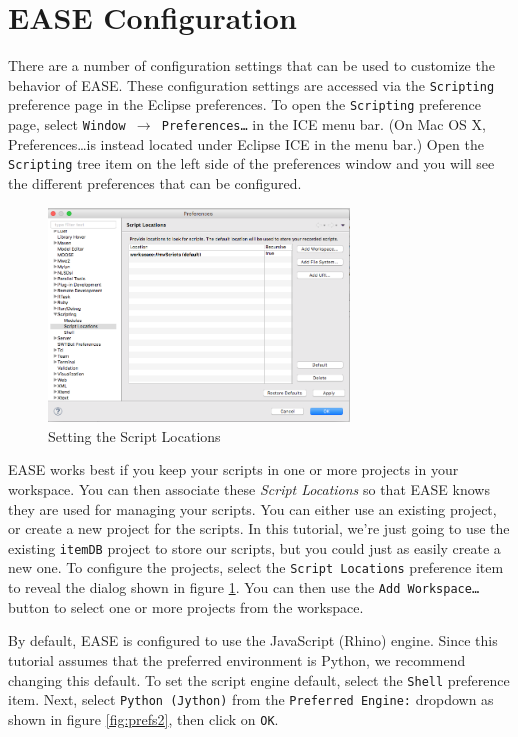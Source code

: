 \section{EASE Configuration}

There are a number of configuration settings that can be used to customize the
behavior of EASE. These configuration settings are accessed via the \texttt{Scripting}
preference page in the Eclipse preferences. To open the \texttt{Scripting}
preference page, select \texttt{Window $\rightarrow$ Preferences\ldots} in the
ICE menu bar. (On Mac OS X, Preferences\ldots is instead located under Eclipse
ICE in the menu bar.) Open the \texttt{Scripting} tree item on the left side of
the preferences window and you will see the different preferences that can be
configured.

\begin{figure}[!ht]
\centering
\includegraphics[width=8cm]{images/scripting-prefs1}
\caption{Setting the Script Locations}
\label{fig:prefs1}
\end{figure}

EASE works best if you keep your scripts in one or more projects in
your workspace. You can then associate these \emph{Script Locations} so
that EASE knows they are used for managing your scripts. You can either use an
existing project, or create a new project for the scripts. In this tutorial,
we're just going to use the existing \texttt{itemDB} project to store our scripts, but
you could just as easily create a new one. To configure the projects, select the
\texttt{Script Locations} preference item to reveal the dialog shown in figure
\ref{fig:prefs1}. You can then use the \texttt{Add Workspace\ldots} button to
select one or more projects from the workspace.

By default, EASE is configured to use the JavaScript (Rhino) engine.
Since this tutorial assumes that the preferred environment is Python, we recommend changing
this default. To set the script engine default, select the
\texttt{Shell} preference item. Next, select \texttt{Python (Jython)} from
the \texttt{Preferred Engine:} dropdown as shown in figure \ref{fig:prefs2},
then click on \texttt{OK}.

